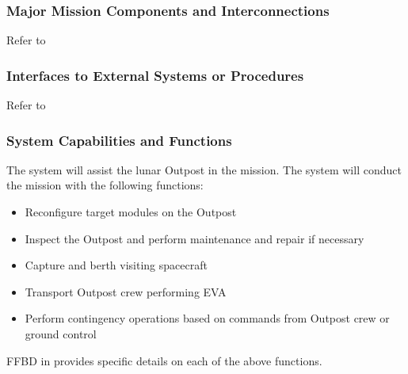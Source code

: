 \subsubsection{Major Mission Components and Interconnections}
Refer to 
\subsubsection{Interfaces to External Systems or Procedures}
Refer to 


\subsubsection{System Capabilities and Functions}
\label{functions}
The system will assist the lunar Outpost in the mission. The system will conduct the mission with the following functions:
\begin{itemize}
\item Reconfigure target modules on the Outpost
\item Inspect the Outpost and perform maintenance and repair if necessary
\item Capture and berth visiting spacecraft
\item Transport Outpost crew performing \gls{EVA}
\item Perform contingency operations based on commands from Outpost crew or ground control
\end{itemize}
\gls{FFBD} in  provides specific details on each of the above functions.




